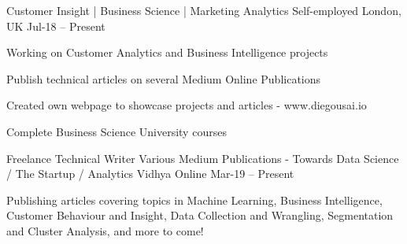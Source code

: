 

\begin{cventries}

  \cventry
    {Customer Insight | Business Science | Marketing Analytics} %
    {Self-employed} %
    {London, UK} %
    {Jul-18 – Present} %
    {
      \begin{cvitems} %
        \item {Working on Customer Analytics and Business Intelligence projects}
        \item {Publish technical articles on several Medium Online Publications}
        \item {Created own webpage to showcase projects and articles - www.diegousai.io}
        \item {Complete Business Science University courses}
      \end{cvitems}
    }

  \cventry
    {Freelance Technical Writer} %
    {Various Medium Publications - Towards Data Science / The Startup / Analytics Vidhya} %
    {Online} %
    {Mar-19 – Present} %
    {
      \begin{cvitems} %
        \item {Publishing articles covering topics in Machine Learning, Business Intelligence, Customer Behaviour and Insight, Data Collection and Wrangling, Segmentation and Cluster Analysis, and more to come!}
      \end{cvitems}
    }


\end{cventries}
